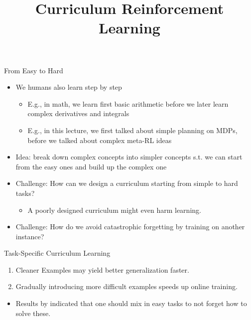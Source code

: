 \documentclass[aspectratio=169]{../latex_main/tntbeamer}  %
\title[Curriculum RL]{Curriculum Reinforcement Learning}
\begin{document}
	
	\maketitle

\begin{frame}[c]{From Easy to Hard}


\begin{itemize}
	\item We humans also learn step by step
	\begin{itemize}
		\item E.g., in math, we learn first basic arithmetic before we later learn complex derivatives and integrals
		\item E.g., in this lecture, we first talked about simple planning on MDPs, before we talked about complex meta-RL ideas
	\end{itemize}
	\smallskip
	\item \alert{Idea:} break down complex concepts into simpler concepts s.t. we can start from the easy ones and build up the complex one
	\item \alert{Challenge}: How can we design a curriculum starting from simple to hard tasks?
	\begin{itemize}
		\item A poorly designed curriculum might even harm learning.
	\end{itemize}
	\item \alert{Challenge}: How do we avoid catastrophic forgetting by training on another instance?
\end{itemize}


\end{frame}
\begin{frame}[c]{Task-Specific Curriculum Learning~}

	\begin{enumerate}
		\item Cleaner Examples may yield better generalization faster.
		\item Gradually introducing more difficult examples speeds up online training.
	\end{enumerate}

	\begin{itemize}
		\item Results by  indicated that one should mix in easy tasks to not forget how to solve these.
	\end{itemize}

	
\end{frame}
\end{document}
